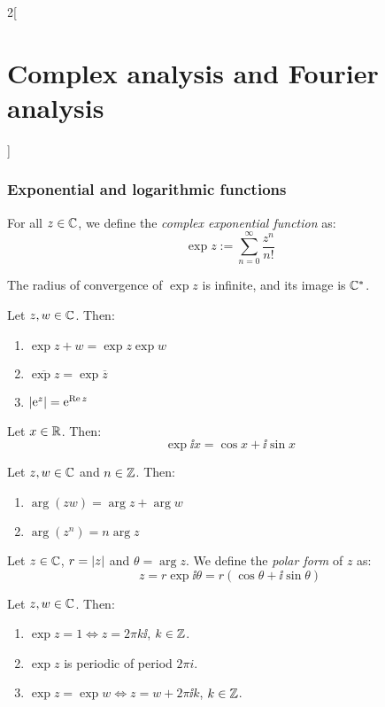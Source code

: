 \documentclass[../../../main.tex]{subfiles}
\begin{document}
\begin{multicols}{2}[\section{Complex analysis and Fourier analysis}]
  \subsubsection{Exponential and logarithmic functions}
  \begin{definition}
    For all $z \in \mathbb{C}$, we define the \textit{complex exponential function} as: $$\exp{z}:=\sum_{n=0}^\infty\frac{z^n}{n!}$$
  \end{definition}
  \begin{proposition}
    The radius of convergence of $\exp{z}$ is infinite, and its image is $\mathbb{C}^*$.
  \end{proposition}
  \begin{proposition}
    Let $z,w\in\mathbb{C}$. Then:
    \begin{enumerate}
      \item $\exp{z+w}=\exp{z}\exp{w}$
      \item $\overline{\exp{z}}=\exp{\overline{z}}$
      \item $\abs{\mathrm{e}^{z}}=\mathrm{e}^{\Re z}$
    \end{enumerate}
  \end{proposition}
  \begin{corollary}
    Let $x\in\mathbb{R}$. Then: $$\exp{\ii x}=\cos x+\ii \sin x$$
  \end{corollary}
  \begin{proposition}
    Let $z, w \in \mathbb{C}$ and $n\in\mathbb{Z}$. Then:
    \begin{enumerate}
      \item $\arg(zw) = \arg z + \arg w$
      \item $\arg(z^n) = n \arg{z}$
    \end{enumerate}
  \end{proposition}
  \begin{definition}
    Let $z\in\mathbb{C}$, $r=\abs{z}$ and $\theta=\arg z$. We define the \emph{polar form} of $z$ as: $$z = r\exp{\ii\theta}=r(\cos{\theta} + \ii\sin{\theta})$$
  \end{definition}
  \begin{corollary}
    Let $z,w\in\mathbb{C}$. Then:
    \begin{enumerate}
      \item $\exp{z}=1\iff z=2\pi k\ii$, $k\in\mathbb{Z}$.
      \item $\exp{z}$ is periodic of period $2\pi i$.
      \item $\exp{z}=\exp{w}\iff z=w+2\pi \ii k$, $k\in\mathbb{Z}$.
    \end{enumerate}

\end{corollary}
\end{multicols}
\end{document}

